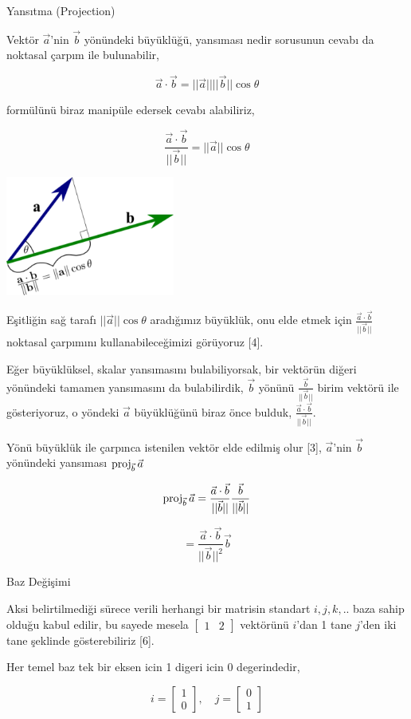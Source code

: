 \documentclass[12pt,fleqn]{article}\usepackage{../../common}
\begin{document}
Yansıtma (Projection)

Vektör $\vec{a}$'nin $\vec{b}$ yönündeki büyüklüğü, yansıması nedir sorusunun
cevabı da noktasal çarpım ile bulunabilir, 

$$
\vec{a}\cdot\vec{b} = ||\vec{a}||||\vec{b}||\cos\theta
$$

formülünü biraz manipüle edersek cevabı alabiliriz, 

$$
\frac{\vec{a}\cdot\vec{b}}{||\vec{b}||} = ||\vec{a}|| \cos \theta
$$

\includegraphics[width=15em]{dot_product_projection.png}

Eşitliğin sağ tarafı $||\vec{a}|| \cos \theta$ aradığımız büyüklük, onu elde
etmek için $\frac{\vec{a}\cdot\vec{b}}{||\vec{b}||}$ noktasal çarpımını
kullanabileceğimizi görüyoruz [4].

Eğer büyüklüksel, skalar yansımasını bulabiliyorsak, bir vektörün diğeri
yönündeki tamamen yansımasını da bulabilirdik, $\vec{b}$ yönünü
$\frac{\vec{b}}{||\vec{b}||}$ birim vektörü ile gösteriyoruz, o yöndeki
$\vec{a}$ büyüklüğünü biraz önce bulduk,
$\frac{\vec{a}\cdot\vec{b}}{||\vec{b}||}$.

Yönü büyüklük ile çarpınca istenilen vektör elde edilmiş olur [3], $\vec{a}$'nin
$\vec{b}$ yönündeki yansıması $\operatorname{proj}_{\vec{b}} \vec{a}$

$$
\operatorname{proj}_{\vec{b}} \vec{a} = \frac{\vec{a}\cdot\vec{b}}{||\vec{b}||} \frac{\vec{b}}{||\vec{b}||}
$$

$$
= \frac{\vec{a}\cdot\vec{b}}{||\vec{b}||^2} \vec{b}
$$

Baz Değişimi

Aksi belirtilmediği sürece verili herhangi bir matrisin standart $i,j,k,..$ baza
sahip olduğu kabul edilir, bu sayede mesela $[\begin{array}{cc}1&2\end{array}]$
vektörünü $i$'dan 1 tane $j$'den iki tane şeklinde gösterebiliriz [6].

Her temel baz tek bir eksen icin 1 digeri icin 0 degerindedir,

$$
i = \left[\begin{array}{c}1 \\ 0 \end{array}\right], \quad
j = \left[\begin{array}{c}0 \\ 1 \end{array}\right]
$$
\end{document}
